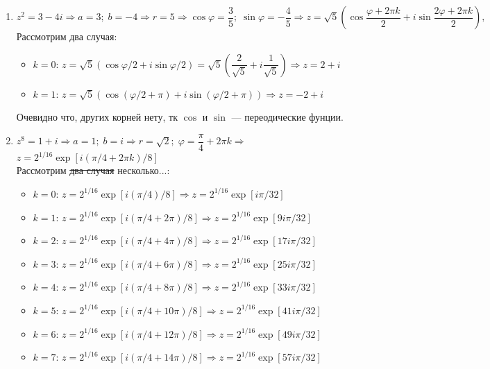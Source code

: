 \documentclass{report}
\begin{document}
\begin{enumerate}
	\item $z^2=3-4i \Rightarrow a=3;\; b=-4 \Rightarrow r=5 \Rightarrow \cos{\varphi}=\dfrac{3}{5};\; \sin{\varphi}=-\dfrac{4}{5} \Rightarrow z=\sqrt{5}(\cos{\dfrac{\varphi+2\pi k}{2}}+i\sin{\dfrac{2\varphi+2\pi k}{2}}), $\\
		Рассмотрим два случая:
		\begin{itemize}
			\item $k=0$: $z=\sqrt{5}(\cos{\varphi/2}+i\sin{\varphi/2})=\sqrt{5}\left(\dfrac{2}{\sqrt{5}}+i\dfrac{1}{\sqrt{5}}\right) \Rightarrow z=2+i$
			\item $k=1$: $z=\sqrt{5}(\cos{(\varphi/2+\pi)}+i\sin{(\varphi/2+\pi)}) \Rightarrow z=-2+i$
		\end{itemize}
		Очевидно что, других корней нету, тк $\cos$ и $\sin$ --- переодические фунции.
\item $z^8=1+i \Rightarrow a=1;\; b=i \Rightarrow r=\sqrt{2};\; \varphi=\dfrac{\pi}{4}+2\pi k \Rightarrow$
	$z=2^{1/16}\exp{\left[i(\pi/4+2\pi k)/8\right]}$\\
	Рассмотрим \sout{два случая} несколько...:
	\begin{itemize}
		\item $k=0$: $z=2^{1/16}\exp{\left[i(\pi/4)/8\right]} \Rightarrow z=2^{1/16}\exp{\left[i\pi/32\right]}$
		\item $k=1$: $z=2^{1/16}\exp{\left[i(\pi/4+2\pi)/8\right]} \Rightarrow z=2^{1/16}\exp{\left[9i\pi/32\right]}$
		\item $k=2$: $z=2^{1/16}\exp{\left[i(\pi/4+4\pi)/8\right]} \Rightarrow z=2^{1/16}\exp{\left[17i\pi/32\right]}$
		\item $k=3$: $z=2^{1/16}\exp{\left[i(\pi/4+6\pi)/8\right]} \Rightarrow z=2^{1/16}\exp{\left[25i\pi/32\right]}$
		\item $k=4$: $z=2^{1/16}\exp{\left[i(\pi/4+8\pi)/8\right]} \Rightarrow z=2^{1/16}\exp{\left[33i\pi/32\right]}$
		\item $k=5$: $z=2^{1/16}\exp{\left[i(\pi/4+10\pi)/8\right]} \Rightarrow z=2^{1/16}\exp{\left[41i\pi/32\right]}$
		\item $k=6$: $z=2^{1/16}\exp{\left[i(\pi/4+12\pi)/8\right]} \Rightarrow z=2^{1/16}\exp{\left[49i\pi/32\right]}$
		\item $k=7$: $z=2^{1/16}\exp{\left[i(\pi/4+14\pi)/8\right]} \Rightarrow z=2^{1/16}\exp{\left[57i\pi/32\right]}$
	\end{itemize}


\end{enumerate}
\end{document}
